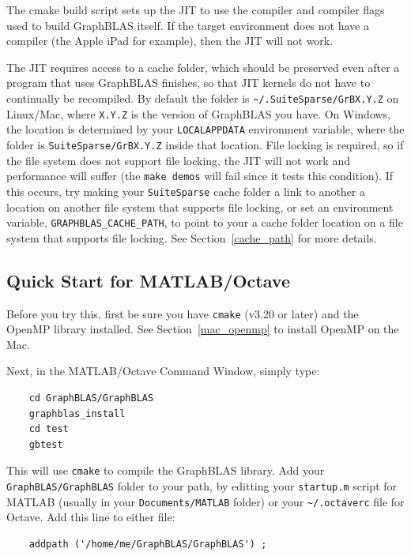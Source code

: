 The cmake build script sets up the JIT to use the compiler and compiler
flags used to build GraphBLAS itself.  If the target environment does not
have a compiler (the Apple iPad for example), then the JIT will not work.

The JIT requires access to a cache folder, which should be preserved
even after a program that uses GraphBLAS finishes, so that JIT kernels do not
have to continually be recompiled.  By default the folder is
\verb'~/.SuiteSparse/GrBX.Y.Z' on Linux/Mac, where \verb'X.Y.Z' is the version
of GraphBLAS you have.  On Windows, the location is determined by your
\verb'LOCALAPPDATA' environment variable, where the folder is
\verb'SuiteSparse/GrBX.Y.Z' inside that location.  File locking is required,
so if the file system does not support file locking, the JIT will not work and
performance will suffer (the \verb'make demos' will fail since it tests this
condition).  If this occurs, try making your \verb'SuiteSparse' cache folder
a link to another a location on another file system that supports file locking,
or set an environment variable, \verb'GRAPHBLAS_CACHE_PATH', to point to your
a cache folder location on a file system that supports file locking.
See Section~\ref{cache_path} for more details.

\subsection{Quick Start for MATLAB/Octave}

Before you try this, first be sure you have \verb'cmake' (v3.20 or later) and
the OpenMP library installed.  See Section~\ref{mac_openmp} to install OpenMP
on the Mac.

Next, in the MATLAB/Octave Command Window, simply type:

    {\small
    \begin{verbatim}
    cd GraphBLAS/GraphBLAS
    graphblas_install
    cd test
    gbtest \end{verbatim} }

This will use \verb'cmake' to compile the GraphBLAS library.  Add your
\verb'GraphBLAS/GraphBLAS' folder to your path, by editting your
\verb'startup.m' script for MATLAB (usually in your \verb'Documents/MATLAB'
folder) or your \verb'~/.octaverc' file for Octave.  Add this line to either
file:

    {\small
    \begin{verbatim}
    addpath ('/home/me/GraphBLAS/GraphBLAS') ; \end{verbatim} }

